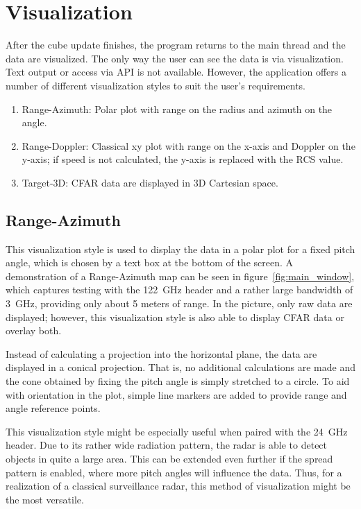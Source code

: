 \section{Visualization}

After the cube update finishes, the program returns to the main thread and the data are visualized.
The only way the user can see the data is via visualization.
Text output or access via API is not available.
However, the application offers a number of different visualization styles to suit the user's requirements.

\begin{enumerate}
	\item Range-Azimuth: Polar plot with range on the radius and azimuth on the angle.
	\item Range-Doppler: Classical xy plot with range on the x-axis and Doppler on the y-axis; if speed is not calculated, the y-axis is replaced with the RCS value.
	\item Target-3D: CFAR data are displayed in 3D Cartesian space.
\end{enumerate}

\subsection{Range-Azimuth}

This visualization style is used to display the data in a polar plot for a fixed pitch angle, which is chosen by a text box at tbe bottom of the screen.
A demonstration of a Range-Azimuth map can be seen in figure~\ref{fig:main_window}, which captures testing with the 122~GHz header and a rather large bandwidth of 3~GHz, providing only about 5 meters of range.
In the picture, only raw data are displayed; however, this visualization style is also able to display CFAR data or overlay both.

Instead of calculating a projection into the horizontal plane, the data are displayed in a conical projection.
That is, no additional calculations are made and the cone obtained by fixing the pitch angle is simply stretched to a circle.
To aid with orientation in the plot, simple line markers are added to provide range and angle reference points.

This visualization style might be especially useful when paired with the 24~GHz header.
Due to its rather wide radiation pattern, the radar is able to detect objects in quite a large area.
This can be extended even further if the spread pattern is enabled, where more pitch angles will influence the data.
Thus, for a realization of a classical surveillance radar, this method of visualization might be the most versatile.

